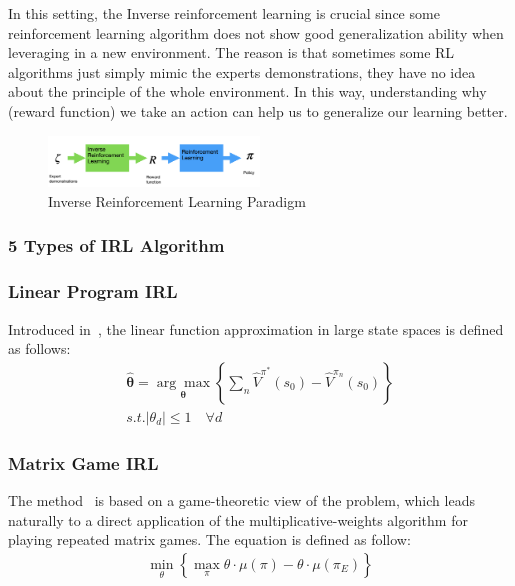 \documentclass[11pt]{article}
\begin{document}
In this setting, the Inverse reinforcement learning is crucial since some reinforcement learning algorithm does not show good generalization ability when leveraging in a new environment. The reason is that sometimes some RL algorithms just simply mimic the experts demonstrations, they have no idea about the principle of the whole environment. In this way, understanding why (reward function) we take an action can help us to generalize our learning better.

\begin{figure}[h]
\centering
\includegraphics[width=0.5\textwidth]{IRL.png}
\caption{Inverse Reinforcement Learning Paradigm}
\end{figure}


\subsubsection{5 Types of IRL Algorithm}

\subsubsection{Linear Program IRL}
Introduced in~\cite{ng2000algorithms}, the linear function approximation in large state spaces is defined as follows:
\begin{align}
    \hat{\boldsymbol{\theta}}=\underset{\boldsymbol{\theta}}{\arg \max }\left\{\sum_{n} \hat{V}^{\pi^{*}}\left(s_{0}\right)-\hat{V}^{\pi_{n}}\left(s_{0}\right)\right\} \\
s.t. \left|\theta_{d}\right| \leq 1 \quad \forall d
\end{align}


\subsubsection{Matrix Game IRL}
The method~\cite{syed2007game} is based on a game-theoretic view of the problem, which leads naturally to a direct application of the multiplicative-weights algorithm for playing repeated matrix games. The equation is defined as follow:
\begin{align}
    \min _{\theta}\left\{\max _{\pi} \theta \cdot \mu(\pi)-\theta \cdot \mu\left(\pi_{E}\right)\right\}
\end{align}
\end{document}
